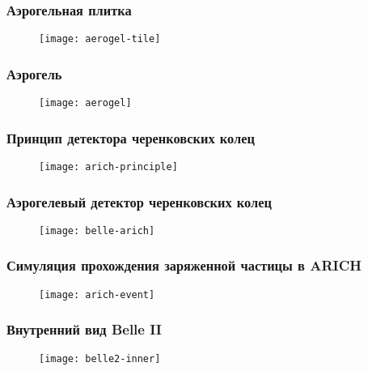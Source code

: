 \begin{frame}
    \frametitle{Аэрогельная плитка}
    \begin{figure}
        \begin{centering}
            \texttt{[image: aerogel-tile]}
        \end{centering}
    \end{figure}
\end{frame}
\begin{frame}
    \frametitle{Аэрогель}
    \begin{figure}
        \begin{centering}
            \texttt{[image: aerogel]}
        \end{centering}
    \end{figure}
\end{frame}
\begin{frame}
    \frametitle{Принцип детектора черенковских колец}
    \begin{figure}
        \begin{centering}
            \texttt{[image: arich-principle]}
        \end{centering}
    \end{figure}
\end{frame}
\begin{frame}
    \frametitle{Аэрогелевый детектор черенковских колец}
    \begin{figure}
        \begin{centering}
            \texttt{[image: belle-arich]}
        \end{centering}
    \end{figure}
\end{frame}
\begin{frame}
    \frametitle{Симуляция прохождения заряженной частицы в ARICH}
    \begin{figure}
        \begin{centering}
            \texttt{[image: arich-event]}
        \end{centering}
    \end{figure}
\end{frame}
\begin{frame}
    \frametitle{Внутренний вид Belle II}
    \begin{figure}
        \begin{centering}
            \texttt{[image: belle2-inner]}
        \end{centering}
    \end{figure}
\end{frame}
